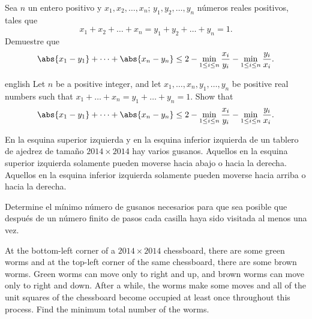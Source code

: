 \begin{problem}
	Sea $n$ un entero positivo y $x_1,x_2,\dots,x_n$; $y_1,y_2,\dots,y_n$ números reales positivos, tales que
	\[x_1+x_2+\dots+x_n=y_1+y_2+\dots+y_n=1.\]
	Demuestre que
	\[\abs{x_1-y_1}+\dots+\abs{x_n-y_n}\le 2-\min_{1\le i\le n}{\frac{x_i}{y_i}}-\min_{1\le i\le n}{\frac{y_i}{x_i}}.\]
	\begin{hint}
		\begin{otherlanguage*}{english}
			Let $n$ be a positive integer, and let $x_1,\dots,x_n,y_1,\dots,y_n$ be positive real numbers such that $x_1+\dots+x_n=y_1+\dots+y_n=1$. Show that
			\[\abs{x_1-y_1}+\dots+\abs{x_n-y_n}\le 2-\min_{1\le i\le n}{\frac{x_i}{y_i}}-\min_{1\le i\le n}{\frac{y_i}{x_i}}.\]
		\end{otherlanguage*}
	\end{hint}
\end{problem}

\begin{problem}
	En la esquina superior izquierda y en la esquina inferior izquierda de un tablero de ajedrez de tamaño $2014\times 2014$ hay varios gusanos. Aquellos en la esquina superior izquierda solamente pueden moverse hacia abajo o hacia la derecha. Aquellos en la esquina inferior izquierda solamente pueden moverse hacia arriba o hacia la derecha.

	Determine el mínimo número de gusanos necesarios para que sea posible que después de un número finito de pasos cada casilla haya sido visitada al menos una vez.
	\forum[aops]{3426175}
	\begin{hint}
		At the bottom-left corner of a $2014\times 2014$ chessboard, there are some green worms and at the top-left corner of the same chessboard, there are some brown worms. Green worms can move only to right and up, and brown worms can move only to right and down. After a while, the worms make some moves and all of the unit squares of the chessboard become occupied at least once throughout this process. Find the minimum total number of the worms.
	\end{hint}
\end{problem}

